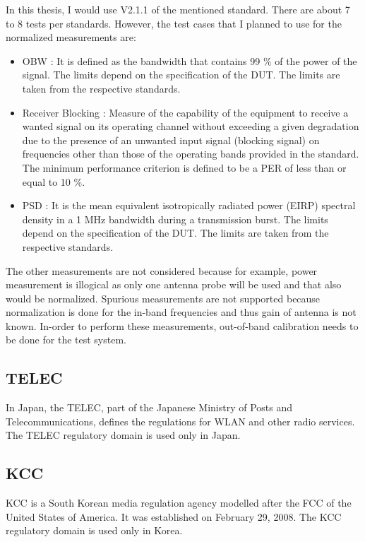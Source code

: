 In this thesis, I would use V2.1.1 of the mentioned standard. There are about 7 to 8 tests per standards. However, the test cases that I planned to use for the normalized measurements are:
\begin{itemize}
\item \acf{OBW} \cite{etsi300328}: It is defined as the bandwidth that contains 99 \% of the power of the signal. The limits depend on the specification of the \acs{DUT}. The limits are taken from the respective standards.
\item Receiver Blocking \cite{etsi300328}:  Measure of the capability of the equipment to receive a wanted signal on its operating channel without exceeding a given degradation due to the presence of an unwanted input signal (blocking signal) on frequencies other than those of the operating bands provided in the standard. The minimum performance criterion is defined to be a \acf{PER} of less than or equal to 10 \%.
\item \acf{PSD} \cite{etsi300328}: It is the mean equivalent isotropically radiated power (\acs{EIRP}) spectral density in a 1 MHz bandwidth during a transmission burst. The limits depend on the specification of the \acs{DUT}. The limits are taken from the respective standards.
\end{itemize}
The other measurements are not considered because for example, power measurement is illogical as only one antenna probe will be used and that also would be normalized. Spurious measurements are not supported because normalization is done for the in-band frequencies and thus gain of antenna is not known. In-order to perform these measurements, out-of-band calibration needs to be done for the test system. 


\subsection{\acf{TELEC}}
In Japan, the \acf{TELEC}, part of the Japanese Ministry of Posts and Telecommunications, defines the regulations for \acs{WLAN} and other radio services. The \acs{TELEC} regulatory domain is used only in Japan.


\subsection{\acf{KCC}}
\acs{KCC} is a South Korean media regulation agency modelled after the \acf{FCC} of the United States of America. It was established on February 29, 2008. The \acs{KCC} regulatory domain is used only in Korea.
 

